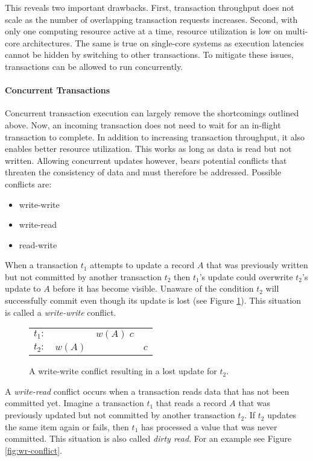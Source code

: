 This reveals two important drawbacks. First, transaction throughput does not
scale as the number of overlapping transaction requests increases. Second, with
only one computing resource active at a time, resource utilization is low on
multi-core architectures. The same is true on single-core systems as execution
latencies cannot be hidden by switching to other transactions. To mitigate these
issues, transactions can be allowed to run concurrently.

\paragraph{Concurrent Transactions}

Concurrent transaction execution can largely remove the shortcomings outlined
above. Now, an incoming transaction does not need to wait for an in-flight
transaction to complete. In addition to increasing transaction throughput, it
also enables better resource utilization. This works as long as data is read but
not written. Allowing concurrent updates however, bears potential conflicts that
threaten the consistency of data and must therefore be addressed. Possible
conflicts are:

\begin{itemize}
    \item write-write
    \item write-read
    \item read-write
\end{itemize}

When a transaction $t_1$ attempts to update a record $A$ that was previously
written but not committed by another transaction $t_2$ then $t_1$'s update could
overwrite $t_2$'s update to $A$ before it has become visible. Unaware of the
condition $t_2$ will successfully commit even though its update is lost (see
Figure \ref{fig:ww-conflict}). This situation is called a \emph{write-write}
conflict.

\begin{figure}[h!]
    \centering
    \begin{tabular}{r c c c}
        $t_1:$ &        & $w(A)\; c$ &     \\
        $t_2:$ & $w(A)$ &            & $c$ \\
    \end{tabular}
    \caption{A write-write conflict resulting in a lost update for $t_2$.}
    \label{fig:ww-conflict}
\end{figure}

A \emph{write-read} conflict occurs when a transaction reads data that has not
been committed yet. Imagine a transaction $t_1$ that reads a record $A$ that was
previously updated but not committed by another transaction $t_2$. If $t_2$
updates the same item again or fails, then $t_1$ has processed a value that was
never committed. This situation is also called \emph{dirty read}. For an example
see Figure \ref{fig:wr-conflict}.

